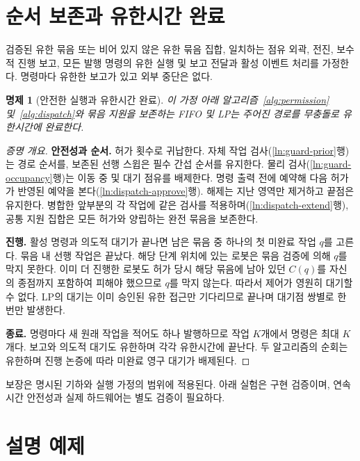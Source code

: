 \documentclass[11pt,a4paper]{article}
\newtheorem{proposition}{명제}
\theoremstyle{remark}
\newcounter{algorithm}
\begin{document}
\section{순서 보존과 유한시간 완료}
\label{sec:control-guarantees}
\label{sec:algorithm-proof}
검증된 유한 묶음 또는 비어 있지 않은 유한 묶음 집합, 일치하는 점유 외곽, 전진, 보수적 진행 보고, 모든 발행 명령의 유한 실행 및 보고 전달과 활성 이벤트 처리를 가정한다. 명령마다 유한한 보고가 있고 외부 중단은 없다.
\begin{proposition}[안전한 실행과 유한시간 완료]
\label{prop:ordered}
\label{prop:controller}
\label{prop:policy-completion}
이 가정 아래 알고리즘~\ref{alg:permission} 및~\ref{alg:dispatch}와 묶음 지원을 보존하는 FIFO 및 LP는 주어진 경로를 무충돌로 유한시간에 완료한다.
\end{proposition}
\begin{proof}[증명 개요]
\textbf{안전성과 순서.} 허가 횟수로 귀납한다. 자체 작업 검사(\ref{ln:guard-prior}행)는 경로 순서를, 보존된 선행 스윕은 필수 간섭 순서를 유지한다. 물리 검사(\ref{ln:guard-occupancy}행)는 이동 중 및 대기 점유를 배제한다. 명령 출력 전에 예약해 다음 허가가 반영된 예약을 본다(\ref{ln:dispatch-approve}행). 해제는 지난 영역만 제거하고 끝점은 유지한다. 병합한 앞부분의 각 작업에 같은 검사를 적용하며(\ref{ln:dispatch-extend}행), 공통 지원 집합은 모든 허가와 양립하는 완전 묶음을 보존한다.

\textbf{진행.} 활성 명령과 의도적 대기가 끝나면 남은 묶음 중 하나의 첫 미완료 작업 $q$를 고른다. 묶음 내 선행 작업은 끝났다. 해당 단계 위치에 있는 로봇은 묶음 검증에 의해 $q$를 막지 못한다. 이미 더 진행한 로봇도 허가 당시 해당 묶음에 남아 있던 $C(q)$를 자신의 종점까지 포함하여 피해야 했으므로 $q$를 막지 않는다. 따라서 제어가 영원히 대기할 수 없다. LP의 대기는 이미 승인된 유한 접근만 기다리므로 끝나며 대기점 쌍별로 한 번만 발생한다.

\textbf{종료.} 명령마다 새 원래 작업을 적어도 하나 발행하므로 작업 $K$개에서 명령은 최대 $K$개다. 보고와 의도적 대기도 유한하며 각각 유한시간에 끝난다. 두 알고리즘의 순회는 유한하며 진행 논증에 따라 미완료 영구 대기가 배제된다.
\end{proof}
보장은 명시된 기하와 실행 가정의 범위에 적용된다. 아래 실험은 구현 검증이며, 연속시간 안전성과 실제 하드웨어는 별도 검증이 필요하다.

\section{설명 예제}
\end{document}

